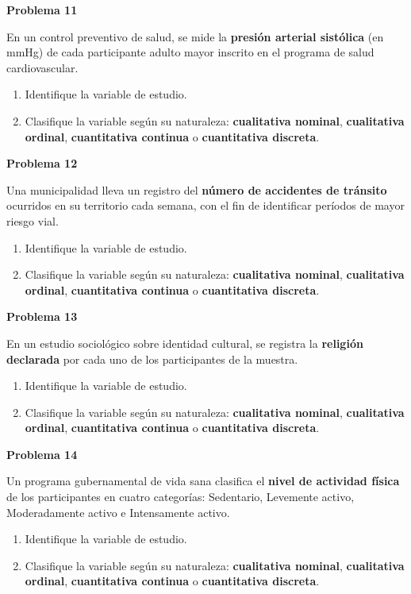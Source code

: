 \documentclass[10pt,letterpaper]{article}
\newcommand{\problema}[1]{%
  \vspace{2pt}%
  \begin{tcolorbox}[
    enhanced,
    colback=white,
    colframe=black,
    arc=0pt,
    boxrule=0pt,
    leftrule=2pt,
    left=6pt, right=6pt,
    top=1pt, bottom=1pt,
  ]
    {\normalsize\bfseries\sffamily #1}
  \end{tcolorbox}%
  \vspace{1pt}%
}
\begin{document}
\problema{Problema 11}
\noindent\sffamily\small En un control preventivo de salud, se mide la \textbf{presi\'on arterial sist\'olica} (en mmHg) de cada participante adulto mayor inscrito en el programa de salud cardiovascular.
\begin{enumerate}[leftmargin=1.2cm, label=\textbf{\alph*)}, itemsep=0pt, topsep=2pt]
  \item Identifique la variable de estudio.
  \item Clasifique la variable seg\'un su naturaleza: \textbf{cualitativa nominal}, \textbf{cualitativa ordinal}, \textbf{cuantitativa continua} o \textbf{cuantitativa discreta}.
\end{enumerate}

\problema{Problema 12}
\noindent\sffamily\small Una municipalidad lleva un registro del \textbf{n\'umero de accidentes de tr\'ansito} ocurridos en su territorio cada semana, con el fin de identificar per\'iodos de mayor riesgo vial.
\begin{enumerate}[leftmargin=1.2cm, label=\textbf{\alph*)}, itemsep=0pt, topsep=2pt]
  \item Identifique la variable de estudio.
  \item Clasifique la variable seg\'un su naturaleza: \textbf{cualitativa nominal}, \textbf{cualitativa ordinal}, \textbf{cuantitativa continua} o \textbf{cuantitativa discreta}.
\end{enumerate}

\problema{Problema 13}
\noindent\sffamily\small En un estudio sociol\'ogico sobre identidad cultural, se registra la \textbf{religi\'on declarada} por cada uno de los participantes de la muestra.
\begin{enumerate}[leftmargin=1.2cm, label=\textbf{\alph*)}, itemsep=0pt, topsep=2pt]
  \item Identifique la variable de estudio.
  \item Clasifique la variable seg\'un su naturaleza: \textbf{cualitativa nominal}, \textbf{cualitativa ordinal}, \textbf{cuantitativa continua} o \textbf{cuantitativa discreta}.
\end{enumerate}

\problema{Problema 14}
\noindent\sffamily\small Un programa gubernamental de vida sana clasifica el \textbf{nivel de actividad f\'isica} de los participantes en cuatro categor\'ias: Sedentario, Levemente activo, Moderadamente activo e Intensamente activo.
\begin{enumerate}[leftmargin=1.2cm, label=\textbf{\alph*)}, itemsep=0pt, topsep=2pt]
  \item Identifique la variable de estudio.
  \item Clasifique la variable seg\'un su naturaleza: \textbf{cualitativa nominal}, \textbf{cualitativa ordinal}, \textbf{cuantitativa continua} o \textbf{cuantitativa discreta}.
\end{enumerate}
\end{document}
